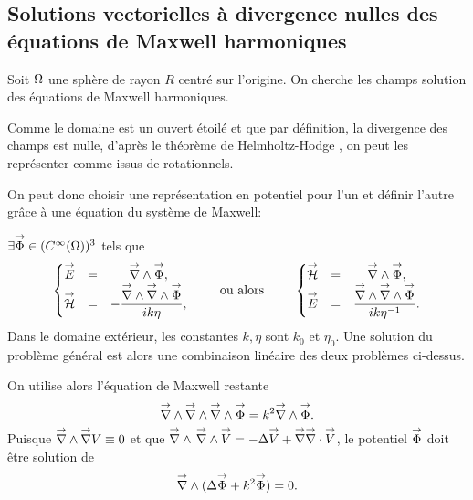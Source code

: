 \subsection{Solutions vectorielles à divergence nulles des équations de Maxwell harmoniques}
\label{sec:sol_maxwell}


Soit \(\Omega\) une sphère de rayon \(R\) centré sur l'origine. On cherche les champs solution des équations de Maxwell harmoniques.

Comme le domaine est un ouvert étoilé et que par définition, la divergence des champs est nulle, d'après le théorème de Helmholtz-Hodge \cite{gui_rigorous_2007}, on peut les représenter comme issus de rotationnels.


On peut donc choisir une représentation en potentiel pour l'un et définir l'autre grâce à une équation du système de Maxwell:


 \(\exists {\overset{\rightarrow}{\Phi}} \in (C^\infty(\Omega))^3\) tels que
\begin{equation}
  \label{eq:sol_maxwell:pot_hertz}
  \left\lbrace\begin{matrix}
    \vE &=& \vrot \vect \Phi,
    \\
    \vH &=& - \frac{\vrot \vrot \vect \Phi}{ik\eta},
  \end{matrix} \right.
  \qquad \text{ ou alors } \qquad
  \left\lbrace\begin{matrix}
    \vH &=& \vrot \vect \Phi,
    \\
    \vE &=& \frac{\vrot \vrot \vect \Phi}{ik\eta^{-1}}.
  \end{matrix}\right.
\end{equation}
Dans le domaine extérieur, les constantes \(k,\eta\) sont \(k_0\) et \(\eta_0\).
Une solution du problème général est alors une combinaison linéaire des deux problèmes ci-dessus.

On utilise alors l'équation de Maxwell restante
\[
    {\overset{\rightarrow}{\nabla}}\wedge {\overset{\rightarrow}{\nabla}}\wedge {\overset{\rightarrow}{\nabla}}\wedge {\overset{\rightarrow}{\Phi}} = k^2 {\overset{\rightarrow}{\nabla}}\wedge {\overset{\rightarrow}{\Phi}}.
\]
Puisque \({\overset{\rightarrow}{\nabla}}\wedge  {\overset{\rightarrow}{\nabla}}  V  \equiv 0\) et que \({\overset{\rightarrow}{\nabla}}\wedge\, {\overset{\rightarrow}{\nabla}}\wedge {\overset{\rightarrow}{V}} = -\Delta {\overset{\rightarrow}{V}} + {\overset{\rightarrow}{\nabla}} {\overset{\rightarrow}{\nabla}}\cdot {\overset{\rightarrow}{V}}\), le potentiel \({\overset{\rightarrow}{\Phi}}\) doit être solution de
\begin{equation}
  \label{eq:sol_maxwell:helmholtz_vect}
  \vrot ( \lapl \vect \Phi + k^2 \vect \Phi ) = 0.
\end{equation}

